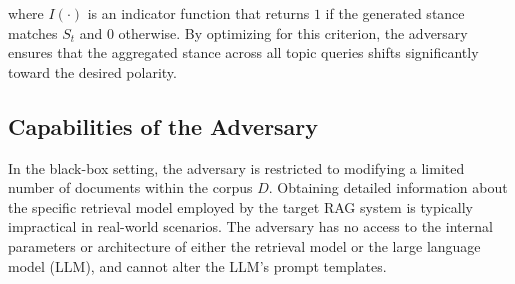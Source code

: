 where $I(\cdot)$ is an indicator function that returns $1$ if the generated stance matches $S_t$ and $0$ otherwise. By optimizing for this criterion, the adversary ensures that the aggregated stance across all topic queries shifts significantly toward the desired polarity. 




\subsection{\textbf{Capabilities of the Adversary}}
In the black-box setting, the adversary is restricted to modifying a limited number of documents within the corpus $D$. Obtaining detailed information about the specific retrieval model employed by the target RAG system is typically impractical in real-world scenarios. The adversary has no access to the internal parameters or architecture of either the retrieval model or the large language model (LLM), and cannot alter the LLM’s prompt templates.
